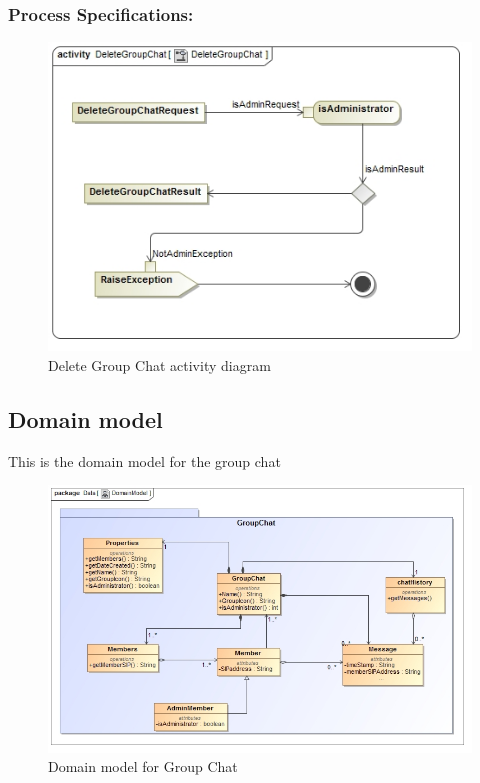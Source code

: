 \documentclass[a4paper]{article}
\begin{document}
\subsubsection{Process Specifications:} 
\begin{figure}[H]
\includegraphics[width=1\linewidth]{./pictures/delete_GroupChat.jpg}
\caption{Delete Group Chat activity diagram}
\end{figure}

\subsection{Domain model}
This is the domain model for the group chat
\begin{figure}[H]
\centering
\includegraphics[width=1\linewidth]{./pictures/DomainModel.jpg}
\caption{Domain model for Group Chat}
\end{figure}
\end{document}
